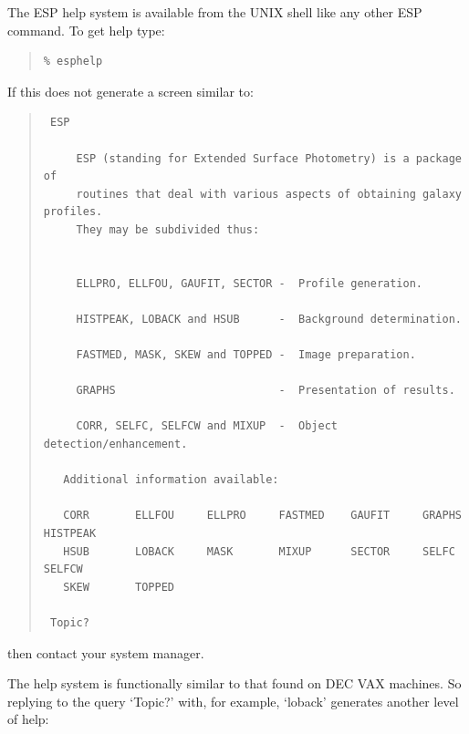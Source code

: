 \documentclass[twoside,11pt]{article}
\newenvironment{myquote}{\begin{quote}\begin{small}}{\end{small}\end{quote}}
\begin{document}
The ESP help system is available from the UNIX shell like any other ESP
command. To get help type:

\begin{myquote}
\begin{verbatim}
% esphelp
\end{verbatim}
\end{myquote}

If this does not generate a screen similar to:

\begin{myquote}
\begin{verbatim}
 ESP

     ESP (standing for Extended Surface Photometry) is a package of
     routines that deal with various aspects of obtaining galaxy profiles.
     They may be subdivided thus:


     ELLPRO, ELLFOU, GAUFIT, SECTOR -  Profile generation.

     HISTPEAK, LOBACK and HSUB      -  Background determination.

     FASTMED, MASK, SKEW and TOPPED -  Image preparation.

     GRAPHS                         -  Presentation of results.

     CORR, SELFC, SELFCW and MIXUP  -  Object detection/enhancement.

   Additional information available:

   CORR       ELLFOU     ELLPRO     FASTMED    GAUFIT     GRAPHS     HISTPEAK
   HSUB       LOBACK     MASK       MIXUP      SECTOR     SELFC      SELFCW
   SKEW       TOPPED

 Topic?
 \end{verbatim}
\end{myquote}

then contact your system manager.

The help system is functionally  similar to that found on DEC VAX machines.
So replying to the query `Topic?' with, for example, `loback' generates
another level of help:
\end{document}
